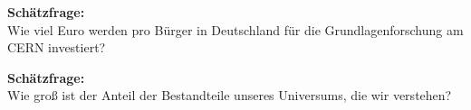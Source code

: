 \begin{frame} \Large
    \begin{center}
     \textcolor{LHCbDarkBlue}{\textbf{Schätzfrage:} }\\  \vspace{1cm}
     Wie viel Euro werden pro Bürger in Deutschland für die Grundlagenforschung am CERN investiert?
    \end{center} \pause
    \begin{center}  \vspace{1cm}
    \end{center}
\end{frame}


\begin{frame} \Large
    \begin{center}
     \textcolor{LHCbDarkBlue}{\textbf{Schätzfrage:} }\\  \vspace{1cm}
     Wie groß ist der Anteil der Bestandteile unseres Universums, die wir verstehen?
    \end{center}\pause 
    \begin{center}  \vspace{1cm}
    \end{center}
\end{frame}



